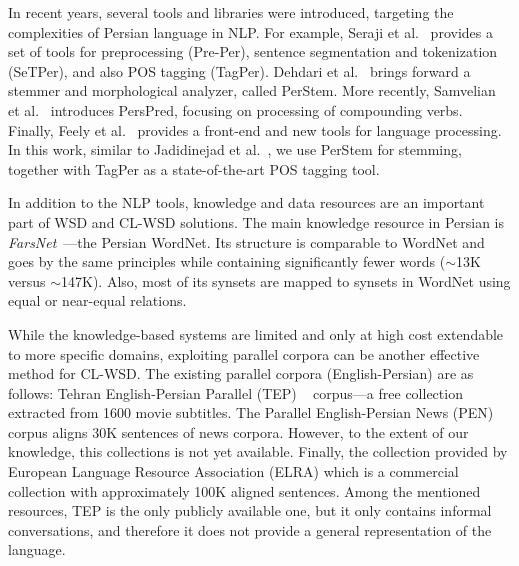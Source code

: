  
In recent years, several tools and libraries were introduced, targeting the complexities of Persian language in NLP. For example, Seraji et al.~ provides a set of tools for preprocessing (Pre-Per), sentence segmentation and tokenization (SeTPer), and also POS tagging (TagPer). Dehdari et al.~ brings forward a stemmer and morphological analyzer, called PerStem. More recently, Samvelian et al.~ introduces PersPred, focusing on processing of compounding verbs. Finally, Feely et al.~ provides a front-end and new tools for language processing. In this work, similar to Jadidinejad et al.~, we use PerStem for stemming, together with TagPer as a state-of-the-art POS tagging tool.

In addition to the NLP tools, knowledge and data resources are an important part of WSD and CL-WSD solutions. The main knowledge resource in Persian is \emph{FarsNet}~\cite{shamsfard2010semi}---the Persian WordNet. Its structure is comparable to WordNet and goes by the same principles while containing significantly fewer words ($\sim$13K versus $\sim$147K). Also, most of its synsets are mapped to synsets in WordNet using equal or near-equal relations.%

While the knowledge-based systems are limited %
and only at high cost extendable to more specific domains, exploiting  parallel corpora can be another effective method for CL-WSD. The existing parallel corpora (English-Persian) are as follows: Tehran English-Persian Parallel (TEP) ~\cite{pilevar2011tep} corpus---a free collection extracted from 1600 movie subtitles. The Parallel English-Persian News (PEN)~\cite{farajian2011pen} corpus aligns 30K sentences of news corpora. However, to the extent of our knowledge, this collections is not yet available. Finally, the collection provided by European Language Resource Association (ELRA) which is a commercial collection with approximately 100K aligned sentences. Among the mentioned resources, TEP is the only publicly available one, but it only contains informal conversations, and therefore it does not provide a general representation of the language.%

